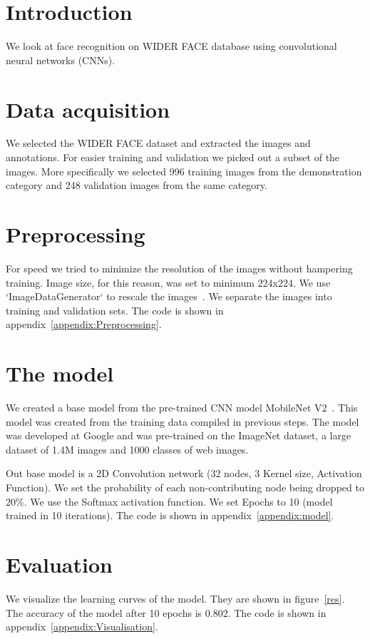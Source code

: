 \documentclass[12pt]{article}
\begin{document}
\maketitle

\section{Introduction}
We look at face recognition on WIDER FACE database using convolutional neural networks (CNNs).

\section{Data acquisition}
We selected the WIDER FACE dataset and extracted the images and annotations.
For easier training and validation we picked out a subset of the images. More specifically we selected 996 training images from the demonstration category and 248 validation images from the same category.

\section{Preprocessing}
For speed we tried to minimize the resolution of the images without hampering training. Image size, for this reason, was set to minimum 224x224.
We use `ImageDataGenerator` to rescale the images~\cite{Building}.
We separate the images into training and validation sets. The code is shown in appendix~\ref{appendix:Preprocessing}.

\section{The model}
We created a base model from the pre-trained CNN model MobileNet V2~\cite{MobileNetV2}. This model was created from the training data compiled in previous steps.
The model was developed at Google and was pre-trained on the ImageNet dataset, a large dataset of 1.4M images and 1000 classes of web images.

Out base model is a 2D Convolution network (32 nodes, 3 Kernel size, Activation Function). We set the probability of each non-contributing node being dropped to 20\%. We use the Softmax activation function. We set Epochs to 10 (model trained in 10 iterations). The code is shown in appendix~\ref{appendix:model}.

\section{Evaluation}
We visualize the learning curves of the model. They are shown in figure~\ref{res}. The accuracy of the model after 10 epochs is 0.802. The code is shown in appendix~\ref{appendix:Visualisation}.
\end{document}
